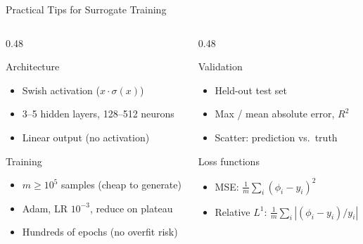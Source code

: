 \documentclass[aspectratio=169,11pt]{beamer}
\begin{document}
\begin{frame}{Practical Tips for Surrogate Training}
\begin{columns}[T]
\begin{column}{0.48\textwidth}
\begin{block}{Architecture}
\begin{itemize}\setlength{\itemsep}{1pt}
  \item Swish activation ($x \cdot \sigma(x)$)
  \item 3--5 hidden layers, 128--512 neurons
  \item Linear output (no activation)
\end{itemize}
\end{block}

\begin{block}{Training}
\begin{itemize}\setlength{\itemsep}{1pt}
  \item $m \geq 10^5$ samples (cheap to generate)
  \item Adam, LR $10^{-3}$, reduce on plateau
  \item Hundreds of epochs (no overfit risk)
\end{itemize}
\end{block}
\end{column}

\begin{column}{0.48\textwidth}
\begin{block}{Validation}
\begin{itemize}\setlength{\itemsep}{1pt}
  \item Held-out test set
  \item Max / mean absolute error, $R^2$
  \item Scatter: prediction vs.\ truth
\end{itemize}
\end{block}

\begin{block}{Loss functions}
\begin{itemize}\setlength{\itemsep}{1pt}
  \item MSE: $\frac{1}{m}\sum_i (\phi_i - y_i)^2$
  \item Relative $L^1$: $\frac{1}{m}\sum_i |(\phi_i - y_i)/y_i|$
\end{itemize}
\end{block}
\end{column}
\end{columns}
\end{frame}
\end{document}
